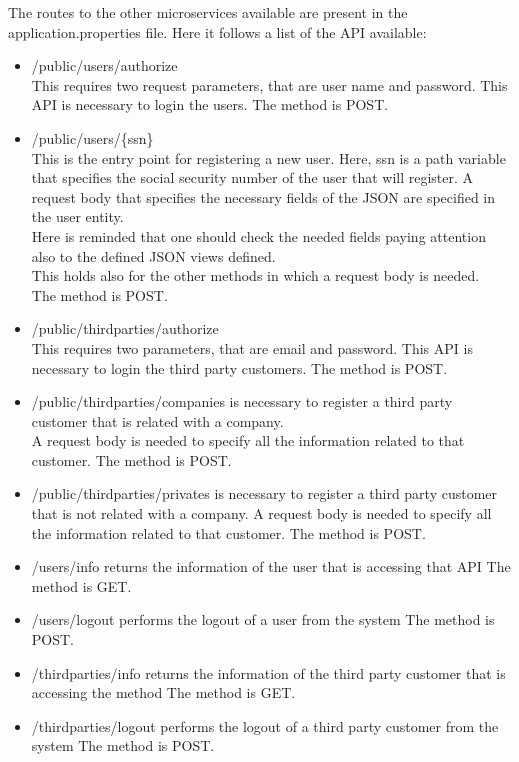 The routes to the other microservices available are present in the application.properties file.
Here it follows a list of the API available:
\begin{itemize}

\item /public/users/authorize \\
This requires two request parameters, that are user name and password. This API is necessary to login the users.
The method is POST.

\item /public/users/\{ssn\} \\
This is the entry point for registering a new user. Here, ssn is a path variable that specifies the social security number
of the user that will register. A request body that specifies the necessary fields of the JSON are specified in the user entity. \\
Here is reminded that one should check the needed fields paying attention also to the defined JSON views defined. \\
This holds also for the other methods in which a request body is needed. \\
The method is POST.


\item /public/thirdparties/authorize \\
This requires two parameters, that are email and password. This API is necessary to login the third party customers. 
The method is POST.

\item /public/thirdparties/companies is necessary to register a third party customer that is related with a company. \\
A request body is needed to specify all the information related to that customer.
The method is POST.

\item /public/thirdparties/privates is necessary to register a third party customer that is not related with a company.
A request body is needed to specify all the information related to that customer.
The method is POST.

\item /users/info returns the information of the user that is accessing that API 
The method is GET.

\item /users/logout performs the logout of a user from the system
The method is POST.

\item /thirdparties/info returns the information of the third party customer that is accessing the method
The method is GET.

\item /thirdparties/logout performs the logout of a third party customer from the system 
The method is POST.

\end{itemize}


